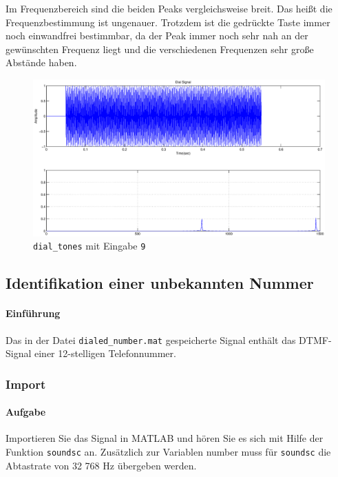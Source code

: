 \documentclass[10pt]{report}
\begin{document}
        Im Frequenzbereich sind die beiden Peaks vergleichsweise breit. Das heißt die
        Frequenzbestimmung ist ungenauer. Trotzdem ist die gedrückte Taste immer
        noch einwandfrei bestimmbar, da der Peak immer noch sehr nah an der
        gewünschten Frequenz liegt und die verschiedenen Frequenzen sehr große
        Abstände haben.

        \vspace{2cm}

        \begin{center}
            \begin{figure}[H]
                \includegraphics[width=\textwidth]{img43422}
                \caption{\texttt{dial\_tones} mit Eingabe \texttt{9}}
            \end{figure}
        \end{center}

        \subsection{Identifikation einer unbekannten Nummer}
        \paragraph{Einführung}
        Das in der Datei \texttt{dialed\_number.mat} gespeicherte Signal enthält das DTMF-Signal einer
        12-stelligen Telefonnummer.


        \subsubsection{Import}
        \paragraph{Aufgabe}
        Importieren Sie das Signal in MATLAB und hören Sie es sich mit Hilfe der Funktion
        \texttt{soundsc} an. Zusätzlich zur Variablen \glqq{}number\grqq{} muss für \texttt{soundsc} die Abtastrate
        von 32 768 Hz übergeben werden.
\end{document}
